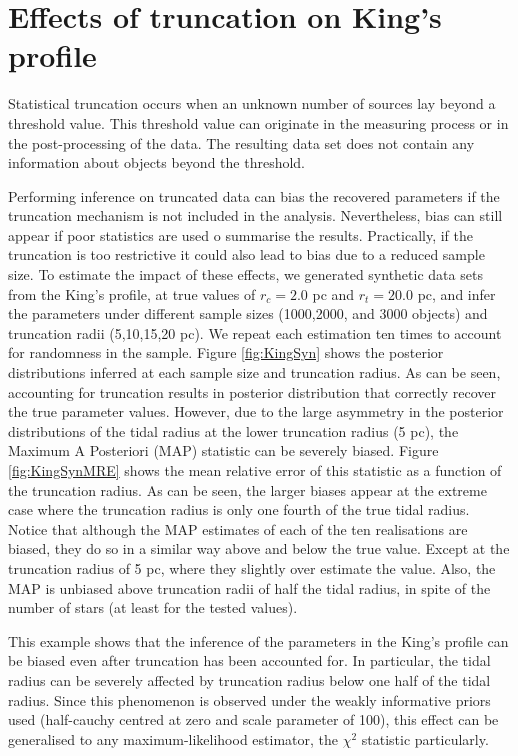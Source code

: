
\chapter{Effects of truncation on King's profile \label{app:truncation}}

Statistical truncation occurs when an unknown number of sources lay beyond a threshold value. This threshold value can originate in the measuring process or in the post-processing of the data. The resulting data set does not contain any information about objects beyond the threshold.

Performing inference on truncated data can bias the recovered parameters if the truncation mechanism is not included in the analysis. Nevertheless, bias can still appear if poor statistics are used o summarise the results. Practically, if the truncation is too restrictive it could also lead to bias due to a reduced sample size. To estimate the impact of these effects, we generated synthetic data sets from the King's profile, at true values of $r_c =2.0$ pc and $r_t=20.0$ pc, and infer the parameters under different sample sizes (1000,2000, and 3000 objects) and truncation radii (5,10,15,20 pc). We repeat each estimation ten times to account for randomness in the sample. Figure \ref{fig:KingSyn} shows the posterior distributions inferred at each sample size and truncation radius. As can be seen, accounting for truncation results in posterior distribution that correctly recover the true parameter values. However, due to the large asymmetry in the posterior distributions of the tidal radius at the lower truncation radius (5 pc), the Maximum A Posteriori (MAP) statistic can be severely biased. Figure \ref{fig:KingSynMRE} shows the mean relative error of this statistic as a function of the truncation radius. As can be seen, the larger biases appear at the extreme case where the truncation radius is only one fourth of the true tidal radius. Notice that although the MAP estimates of each of the ten realisations are biased, they do so in a similar way above and below the true value. Except at the truncation radius of 5 pc, where they slightly over estimate the value. Also, the MAP is unbiased above truncation radii of half the tidal radius, in spite of the number of stars (at least for the tested values).

This example shows that the inference of the parameters in the King's profile can be biased even after truncation has been accounted for. In particular, the tidal radius can be severely affected by truncation radius below one half of the tidal radius. Since this phenomenon is observed under the weakly informative priors used (half-cauchy centred at zero and scale parameter of 100), this effect can be generalised to any maximum-likelihood estimator, the $\chi^2$ statistic particularly. 

